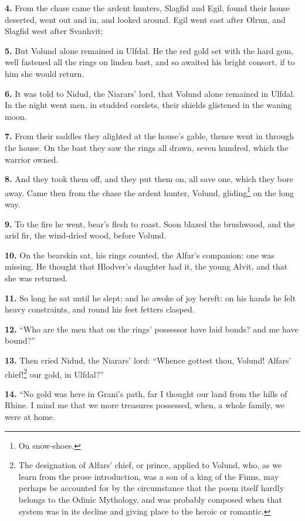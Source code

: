 \textbf{4.} From the chase came the ardent hunters, Slagfid and Egil, found
their house deserted, went out and in, and looked around. Egil went
east after Olrun, and Slagfid west after Svanhvit;

\textbf{5.} But Volund alone remained in Ulfdal. He the red gold set with the
hard gem, well fastened all the rings on linden bast, and so awaited
his bright consort, if to him she would return.

\textbf{6.} It was told to Nidud, the Niarars' lord, that Volund alone
remained in Ulfdal. In the night went men, in studded corslets, their
shields glistened in the waning moon.

\textbf{7.} From their saddles they alighted at the house's gable, thence
went in through the house. On the bast they saw the rings all drawn,
seven hundred, which the warrior owned.

\textbf{8.} And they took them off, and they put them on, all save one, which
they bore away. Came then from the chase the ardent hunter, Volund,
gliding\footnote{On snow-shoes.} on the long way.

\textbf{9.} To the fire he went, bear's flesh to roast. Soon blazed the
brushwood, and the arid fir, the wind-dried wood, before Volund.

\textbf{10.} On the bearskin sat, his rings counted, the Alfar's companion:
one was missing. He thought that Hlodver's daughter had it, the young
Alvit, and that she was returned.

\textbf{11.} So long he sat until he slept; and he awoke of joy bereft: on
his hands he felt heavy constraints, and round his feet fetters
clasped.

\textbf{12.} ``Who are the men that on the rings' possessor have laid bonds?
and me have bound?''

\textbf{13.} Then cried Nidud, the Niarars' lord: ``Whence gottest thou,
Volund! Alfars' chief!\footnote{The designation of Alfars' chief, or prince, applied to
Volund, who, as we learn from the prose introduction, was a son of a
king of the Finns, may perhaps be accounted for by the circumstance
that the poem itself hardly belongs to the Odinic Mythology, and was
probably composed when that system was in its decline and giving place
to the heroic or romantic.} our gold, in Ulfdal?''

\textbf{14.} ``No gold was here in Grani's path, far I thought our land from
the hills of Rhine. I mind me that we more treasures possessed, when,
a whole family, we were at home.

